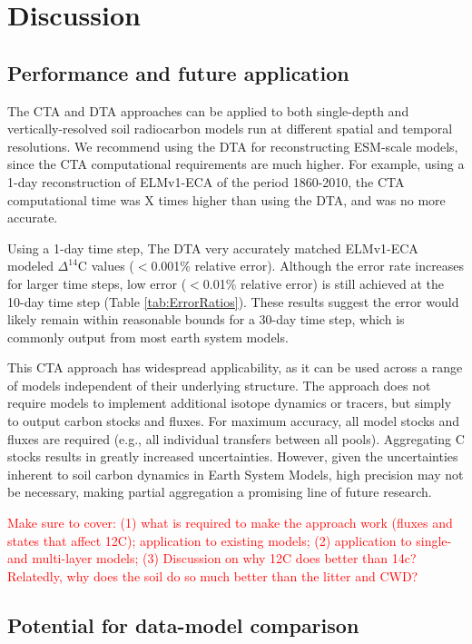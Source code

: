 \documentclass[11pt,a4paper]{article}
\newcommand{\red}[1]{\textcolor{red}{#1}}
\begin{document}
\section{Discussion}

\subsection{Performance and future application}
The CTA and DTA approaches can be applied to both single-depth and vertically-resolved soil radiocarbon models run at different spatial and temporal resolutions. We recommend using the DTA for reconstructing ESM-scale models, since the CTA computational requirements are much higher. For example, using a 1-day reconstruction of ELMv1-ECA of the period 1860-2010, the CTA computational time was X times higher than using the DTA, and was no more accurate.

Using a 1-day time step, The DTA very accurately matched ELMv1-ECA modeled $\Delta^{14}$C values ($<$0.001\% relative error). Although the error rate increases for larger time steps, low error ($<$0.01\% relative error) is still achieved at the 10-day time step (Table \ref{tab:ErrorRatios}). These results suggest the error would likely remain within reasonable bounds for a 30-day time step, which is commonly output from most earth system models. 

This CTA approach has widespread applicability, as it can be used across a range of models independent of their underlying structure. The approach does not require models to implement additional isotope dynamics or tracers, but simply to output carbon stocks and fluxes. For maximum accuracy, all model stocks and fluxes are required (e.g., all individual transfers between all pools). Aggregating C stocks results in greatly increased uncertainties. However, given the uncertainties inherent to soil carbon dynamics in Earth System Models, high precision may not be necessary, making partial aggregation a promising line of future research. 

\red{Make sure to cover: (1) what is required to make the approach work (fluxes and states that affect 12C); application to existing models; (2) application to single- and multi-layer models; (3) Discussion on why 12C does better than 14c? Relatedly, why does the soil do so much better than the litter and CWD? }
\subsection{Potential for data-model comparison}
\end{document}
